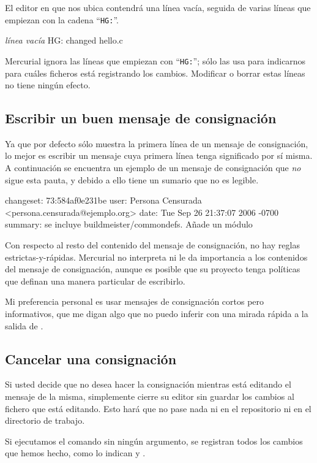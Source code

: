 El editor en que  nos ubica contendrá una línea vacía,
seguida de varias líneas que empiezan con la cadena ``\texttt{HG:}''.
\begin{codesample2}
  \emph{línea vacía}
  HG: changed hello.c
\end{codesample2}
Mercurial ignora las líneas que empiezan con ``\texttt{HG:}''; sólo
las usa para indicarnos para cuáles ficheros está registrando los
cambios. Modificar o borrar estas líneas no tiene ningún efecto.

\subsection{Escribir un buen mensaje de consignación}

Ya que por defecto  sólo muestra la primera línea de un
mensaje de consignación, lo mejor es escribir un mensaje cuya primera
línea tenga significado por sí misma. A continuación se encuentra un
ejemplo de un mensaje de consignación que \emph{no} sigue esta
pauta, y debido a ello tiene un sumario que no es legible.
\begin{codesample2}
  changeset:   73:584af0e231be
  user:        Persona Censurada <persona.censurada@ejemplo.org>
  date:        Tue Sep 26 21:37:07 2006 -0700
  summary:     se incluye buildmeister/commondefs.   Añade un módulo
\end{codesample2}

Con respecto al resto del contenido del mensaje de consignación, no
hay reglas estrictas-y-rápidas. Mercurial no interpreta ni le da
importancia a los contenidos del mensaje de consignación, aunque es
posible que su proyecto tenga políticas que definan una manera
particular de escribirlo.

Mi preferencia personal es usar mensajes de consignación cortos pero
informativos, que me digan algo que no puedo inferir con una mirada
rápida a la salida de .

\subsection{Cancelar una consignación}

Si usted decide que no desea hacer la consignación mientras está
editando el mensaje de la misma, simplemente cierre su editor sin
guardar los cambios al fichero que está editando. Esto hará que no
pase nada ni en el repositorio ni en el directorio de trabajo.

Si ejecutamos el comando  sin ningún argumento, se
registran todos los cambios que hemos hecho, como lo indican
 y .

